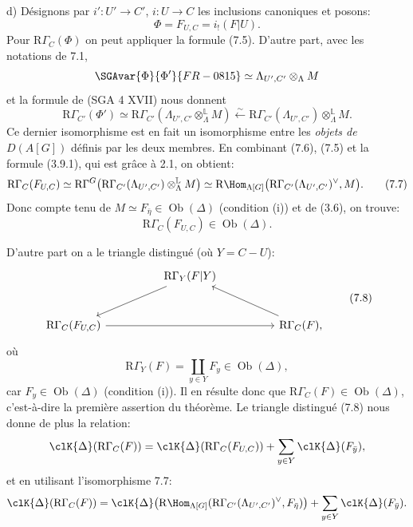 d) Désignons par $i':U'\to C'$, $i:U\to C$ les inclusions canoniques et posons:
\[
\Phi=F_{U,C}=i_!(F|U).
\]
Pour  $\mathrm{R}\Gamma_C(\Phi)$ on peut appliquer la formule (7.5). D'autre part, avec les notations de 7.1,
\[
\SGAvar{\Phi}{\Phi'}{FR-0815}\simeq \Lambda_{U',C'}\otimes_\Lambda M
\]
et la formule de  (SGA 4 XVII) nous donnent
\[
\mathrm{R}\Gamma_{C'}(\Phi')
\simeq
\mathrm{R}\Gamma_{C'}(\Lambda_{U',C'}\otimes_\Lambda^{\mathbb{L}} M)
\xleftarrow{\sim}
\mathrm{R}\Gamma_{C'}(\Lambda_{U',C'})\otimes_\Lambda^{\mathbb{L}} M.
\tag{7.6}
\]
Ce
dernier isomorphisme est en fait un isomorphisme entre les \emph{objets de} $D(A[G])$ définis par les deux membres. En combinant (7.6), (7.5) et la formule (3.9.1), qui est  grâce à 2.1, on obtient:
\[
\mathrm{R}\Gamma_C(F_{U,C})
\simeq
\mathrm{R}\Gamma^G\bigl(\mathrm{R}\Gamma_{C'}(\Lambda_{U',C'})\otimes_\Lambda^{\mathbb{L}} M\bigr)
\simeq
\mathrm{R}\Hom_{\Lambda[G]}\bigl(\mathrm{R}\Gamma_{C'}(\Lambda_{U',C'})^\vee,M\bigr).
\tag{7.7}
\]
Donc compte tenu de $M\simeq F_{\bar\eta}\in\operatorname{Ob}(\Delta)$ (condition (i)) et de (3.6), on trouve:
\[
\mathrm{R}\Gamma_C(F_{U,C})\in\operatorname{Ob}(\Delta).
\]

D'autre part on a le triangle distingué (où $Y=C-U$):
\[
\begin{tikzcd}[column sep=huge,row sep=large]
& \mathrm{R}\Gamma_Y(F|Y) \arrow[dl] & \\
\mathrm{R}\Gamma_C(F_{U,C}) \arrow[rr] && \mathrm{R}\Gamma_C(F), \arrow[ul]
\end{tikzcd}
\tag{7.8}
\]
où 
\[
\mathrm{R}\Gamma_Y(F)=\coprod_{y\in Y}F_y\in\operatorname{Ob}(\Delta),
\]
car $F_y\in\operatorname{Ob}(\Delta)$ (condition (i)). Il en résulte donc que $\mathrm{R}\Gamma_C(F)\in\operatorname{Ob}(\Delta)$, c'est-à-dire la première assertion du théorème. Le triangle distingué (7.8) nous donne de plus la relation:
\[
\clK{\Delta}(\mathrm{R}\Gamma_C(F))
=
\clK{\Delta}(\mathrm{R}\Gamma_C(F_{U,C}))
+\sum_{y\in Y}\clK{\Delta}(F_{\bar y}),
\]
et en utilisant l'isomorphisme 7.7:
\[
\clK{\Delta}(\mathrm{R}\Gamma_C(F))
=
\clK{\Delta}\bigl(\mathrm{R}\Hom_{\Lambda[G]}(\mathrm{R}\Gamma_{C'}(\Lambda_{U',C'})^\vee,F_{\bar\eta})\bigr)
+\sum_{y\in Y}\clK{\Delta}(F_{\bar y}).
\]

